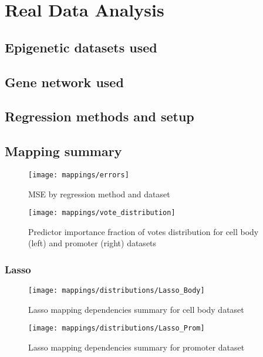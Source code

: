 \chapter{Real Data Analysis}

\section{Epigenetic datasets used}

\section{Gene network used}

\section{Regression methods and setup}

\section{Mapping summary}

\pagebreak

\begin{figure}[H]
	\centering
	\texttt{[image: mappings/errors]}
	\caption{MSE by regression method and dataset}
	\label{fig:map_errors}
\end{figure}

\pagebreak

\begin{figure}[H]
	\centering
	\texttt{[image: mappings/vote\_distribution]}
	\caption{Predictor importance fraction of votes distribution for cell body (left) and promoter (right) datasets}
	\label{fig:map_vote_dist}
\end{figure}


\pagebreak
\subsection{Lasso}

\begin{figure}[H]
	\centering
	\texttt{[image: mappings/distributions/Lasso\_Body]}
	\caption{Lasso mapping dependencies summary for cell body dataset}
	\label{fig:map_body_lasso}
\end{figure}

\begin{figure}[H]
	\centering
	\texttt{[image: mappings/distributions/Lasso\_Prom]}
	\caption{Lasso mapping dependencies summary for promoter dataset}
	\label{fig:map_prom_lasso}
\end{figure}



